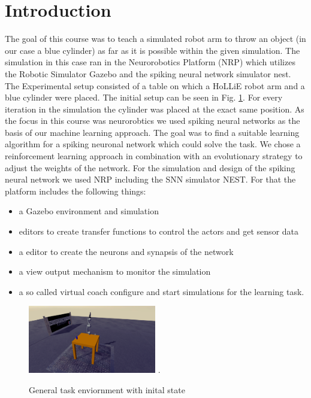 \section{Introduction}
The goal of this course was to teach a simulated robot arm to throw an object (in our case a blue cylinder) as far as it is possible within the given simulation. The simulation in this case ran in the Neurorobotics Platform (NRP) which utilizes the Robotic Simulator Gazebo and the spiking neural network simulator nest.\\%
The Experimental setup consisted of a table on which a HoLLiE robot arm and a blue cylinder were placed.
The initial setup can be seen in Fig. \ref{init_state}. For every iteration in the simulation the cylinder was placed at the exact same position. 
As the focus in this course was neurorobtics we used spiking neural networks as the basis of our machine learning approach.  
The goal was to find a suitable learning algorithm for a spiking neuronal network which could solve the task. We chose a reinforcement learning approach in combination with an evolutionary strategy to adjust the weights of the network.
For the simulation and design of the spiking neural network we used NRP including the SNN simulator NEST. For that the platform includes the following things:
 \begin{itemize}
\item a Gazebo environment and simulation
\item editors to create transfer functions to control the actors and get sensor data
\item a editor to create the neurons and synapsis of the network
\item a view output mechanism to monitor the simulation
\item a so called virtual coach configure and start simulations for the learning task.
\end{itemize} 
\begin{figure}[H]
	\centering
	\includegraphics[width=2.2in]{img/init_state.png}
	\DeclareGraphicsExtensions.
	\caption{General task enviornment with inital state }
	\label{init_state}
\end{figure}

